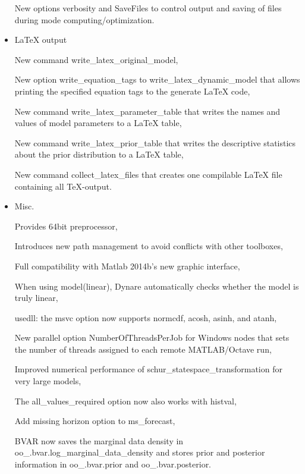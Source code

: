\documentclass[cn,10pt,math=newtx,citestyle=gb7714-2015,bibstyle=gb7714-2015]{elegantbook}
\begin{document}
\begin{itemize}
		
		New options verbosity and SaveFiles to control output and saving of files during mode computing/optimization.
		
		
		
		
		\item LaTeX output
		
		
		New command write\_latex\_original\_model,
		
		
		New option write\_equation\_tags to write\_latex\_dynamic\_model that allows printing the specified equation tags to the generate
		LaTeX code,
		
		
		New command write\_latex\_parameter\_table that writes the names and values of model parameters to a LaTeX table,
		
		
		New command write\_latex\_prior\_table that writes the descriptive statistics about the prior distribution to a LaTeX table,
		
		
		New command collect\_latex\_files that creates one compilable LaTeX file containing all TeX-output.
		
		
		
		
		\item Misc.
		
		
		Provides 64bit preprocessor,
		
		
		Introduces new path management to avoid conflicts with other toolboxes,
		
		
		Full compatibility with Matlab 2014b's new graphic interface,
		
		
		When using model(linear), Dynare automatically checks whether the model is truly linear,
		
		
		usedll: the msvc option now supports normcdf, acosh, asinh, and atanh,
		
		
		New parallel option NumberOfThreadsPerJob for Windows nodes that sets the number of threads assigned to each remote MATLAB/Octave run,
		
		
		Improved numerical performance of schur\_statespace\_transformation for very large models,
		
		
		The all\_values\_required option now also works with histval,
		
		
		Add missing horizon option to ms\_forecast,
		
		
		BVAR now saves the marginal data density in oo\_.bvar.log\_marginal\_data\_density and stores prior and posterior information in oo\_.bvar.prior and oo\_.bvar.posterior.
	\end{itemize}
	
	
	
\end{document}
